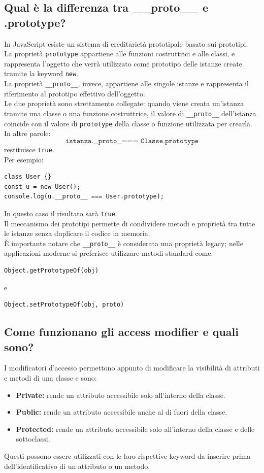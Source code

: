 \documentclass[12pt]{article}
\begin{document}
\subsection{Qual è la differenza tra \_\_proto\_\_ e .prototype?}
In JavaScript esiste un sistema di ereditarietà prototipale basato sui prototipi.\\
La proprietà \texttt{prototype} appartiene alle funzioni costruttrici e alle classi, e rappresenta l'oggetto che verrà utilizzato come prototipo delle istanze create tramite la keyword \texttt{new}.\\
La proprietà \texttt{\_\_proto\_\_}, invece, appartiene alle singole istanze e rappresenta il riferimento al prototipo effettivo dell'oggetto.\\
Le due proprietà sono strettamente collegate: quando viene creata un'istanza tramite una classe o una funzione costruttrice, il valore di \texttt{\_\_proto\_\_} dell'istanza coincide con il valore di \texttt{prototype} della classe o funzione utilizzata per crearla.\\
In altre parole:
\[
\texttt{istanza.\_\_proto\_\_ === Classe.prototype}
\]
restituisce \texttt{true}.\\
Per esempio:
\begin{verbatim}
class User {}
const u = new User();
console.log(u.__proto__ === User.prototype);
\end{verbatim}
In questo caso il risultato sarà \texttt{true}.\\
Il meccanismo dei prototipi permette di condividere metodi e proprietà tra tutte le istanze senza duplicare il codice in memoria.\\
È importante notare che \texttt{\_\_proto\_\_} è considerata una proprietà legacy; nelle applicazioni moderne si preferisce utilizzare metodi standard come:
\begin{verbatim}
Object.getPrototypeOf(obj)
\end{verbatim}
e
\begin{verbatim}
Object.setPrototypeOf(obj, proto)
\end{verbatim}

\subsection{Come funzionano gli access modifier e quali sono?}

I modificatori d'accesso permettono appunto di modificare la visibilità di attributi e metodi di una classe e sono:
\begin{itemize}
  \item \textbf{Private:} rende un attributo accessibile solo all'interno della classe.
  \item \textbf{Public:} rende un attributo accessibile anche al di fuori della classe.
  \item \textbf{Protected:} rende un attributo accessibile solo all'interno della classe e delle sottoclassi.
\end{itemize}
Questi possono essere utilizzati con le loro rispettive keyword da inserire prima dell'identificativo di un attributo o un metodo.
\end{document}
